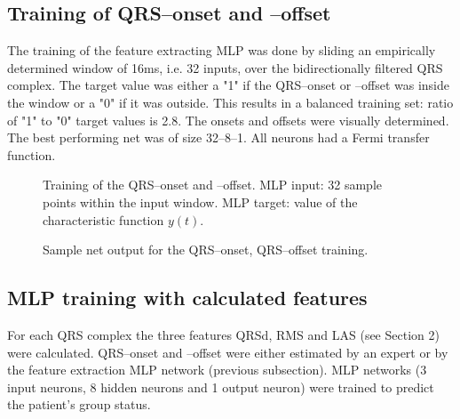 \documentclass[twocolumn]{cinc}
\begin{document}
\clearpage



\subsection{Training of QRS--onset and --offset}

The training of the feature extracting MLP was done by sliding an empirically
determined window of 16ms, i.e. 32 inputs, over the bidirectionally filtered QRS complex.
The target value was either a "1" if the QRS--onset or --offset was inside the window
or a  "0" if it was outside. This results in a balanced training set: ratio of "1" to "0" target values is 2.8.
The onsets and offsets were visually determined.
The best performing net was of size 32--8--1. All neurons
had a Fermi transfer function.
 
\begin{figure}[ht] 
\centerline{\hspace*{0cm}}
\vspace*{-3cm} 
\caption{Training of the QRS--onset and --offset. MLP input: 32 sample points within the
input window. MLP target: value of the characteristic function $y(t)$.}
\label{mlp2} \vspace*{3mm} 
\end{figure}
       
        
\begin{figure}[ht] 
\centerline{\hspace*{-5mm}}
\caption{Sample net output for the QRS--onset, QRS--offset training.}     
\label{mlp3} \vspace*{3mm} 
\end{figure}



\subsection{MLP training with calculated features}

For each QRS complex the three features QRSd, RMS and LAS (see Section 2) were calculated.
QRS--onset and --offset were either estimated by an expert or by the feature extraction MLP
network (previous subsection). MLP networks (3 input neurons, 8 hidden neurons and 1 output
neuron) were trained to predict the patient's group status.
\end{document}
